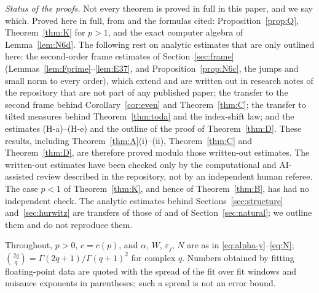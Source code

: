 \emph{Status of the proofs.} Not every theorem is proved in full in this paper, and we say which. Proved here in full, from \cite{PaperII} and the formulas
cited: Proposition~\ref{prop:Q}, Theorem~\ref{thm:K} for $p>1$, and the exact computer algebra of Lemma~\ref{lem:N6d}. The following rest on analytic estimates that are only outlined here: the second-order frame
estimates of Section~\ref{sec:frame} (Lemmas~\ref{lem:Fprime}--\ref{lem:E37}, and Proposition~\ref{prop:N6c}, the jumps and small norm to
every order), which extend \cite{PaperII} and are written out in research notes of the repository that are not part of any published paper;
the transfer to the second frame behind Corollary~\ref{cor:even} and Theorem~\ref{thm:C}; the transfer to tilted measures behind
Theorem~\ref{thm:toda} and the index-shift law; and the estimates (H-a)--(H-e) and the outline of the proof of Theorem~\ref{thm:D}. These
results, including Theorem~\ref{thm:A}(i)--(ii), Theorem~\ref{thm:C} and Theorem~\ref{thm:D}, are therefore proved modulo those written-out
estimates. The written-out estimates have been checked only by the computational and AI-assisted review described in the repository, not by an
independent human referee. The case $p<1$ of Theorem~\ref{thm:K}, and hence of Theorem~\ref{thm:B}, has had no independent check. The
analytic estimates behind Sections~\ref{sec:structure} and~\ref{sec:hurwitz} are transfers of those of \cite{PaperII} and of
Section~\ref{sec:natural}; we outline them and do not reproduce them.

Throughout, $p>0$, $c=c(p)$, and $\alpha$, $W$, $\varepsilon_j$, $N$ are as in \eqref{eq:alpha-y}--\eqref{eq:N}; $\binom{2q}{q}=
\Gamma(2q+1)/\Gamma(q+1)^2$ for complex $q$. Numbers obtained by fitting floating-point data are quoted with the spread of the fit over fit
windows and nuisance exponents in parentheses; such a spread is not an error bound.
